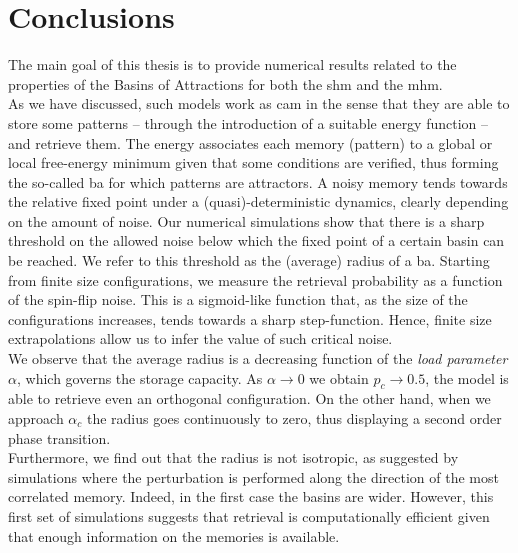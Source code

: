 \documentclass[\rootdir/main.tex]{subfiles}
\begin{document}
\chapter{Conclusions}\label{chap:conclusions}
The main goal of this thesis is to provide numerical results related to the properties of the Basins of Attractions for both the \acrlong{shm} and the \acrlong{mhm}.\\
As we have discussed, such models work as \acrlong{cam} in the sense that they are able to store some patterns -- through the introduction of a suitable energy function -- and retrieve them. The energy associates each memory (pattern) to a global or local free-energy minimum given that some conditions are verified, thus forming the so-called \acrlong{ba} for which patterns are attractors. A noisy memory tends towards the relative fixed point under a (quasi)-deterministic dynamics, clearly depending on the amount of noise. Our numerical simulations show that there is a sharp threshold on the allowed noise below which the fixed point of a certain basin can be reached. We refer to this threshold as the (average) radius of a \acrshort{ba}. Starting from finite size configurations, we measure the retrieval probability as a function of the spin-flip noise. This is a sigmoid-like function that, as the size of the configurations increases, tends towards a sharp step-function. Hence, finite size extrapolations allow us to infer the value of such critical noise.\\
We observe that the average radius is a decreasing function of the \emph{load parameter} $\alpha$, which governs the storage capacity. As $\alpha \to 0$ we obtain $p_c \to 0.5$, \ie the model is able to retrieve even an orthogonal configuration. On the other hand, when we approach $\alpha_c$ the radius goes continuously to zero, thus displaying a second order phase transition.\\
Furthermore, we find out that the radius is not isotropic, as suggested by simulations where the perturbation is performed along the direction of the most correlated memory. Indeed, in the first case the basins are wider.
However, this first set of simulations suggests that retrieval is computationally efficient given that enough information on the memories is available.
\end{document}
